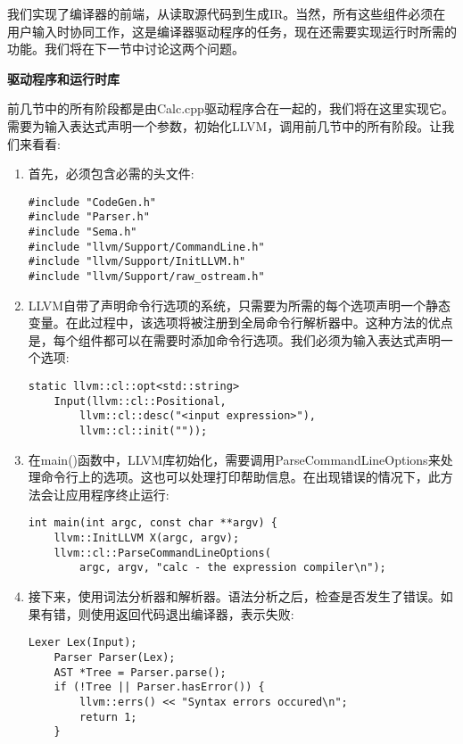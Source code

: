 我们实现了编译器的前端，从读取源代码到生成IR。当然，所有这些组件必须在用户输入时协同工作，这是编译器驱动程序的任务，现在还需要实现运行时所需的功能。我们将在下一节中讨论这两个问题。\par

\hspace*{\fill} \par %
\textbf{驱动程序和运行时库}

前几节中的所有阶段都是由Calc.cpp驱动程序合在一起的，我们将在这里实现它。需要为输入表达式声明一个参数，初始化LLVM，调用前几节中的所有阶段。让我们来看看:

\begin{enumerate}
\item 首先，必须包含必需的头文件:
\begin{lstlisting}[caption={}]
#include "CodeGen.h"
#include "Parser.h"
#include "Sema.h"
#include "llvm/Support/CommandLine.h"
#include "llvm/Support/InitLLVM.h"
#include "llvm/Support/raw_ostream.h"
\end{lstlisting}

\item LLVM自带了声明命令行选项的系统，只需要为所需的每个选项声明一个静态变量。在此过程中，该选项将被注册到全局命令行解析器中。这种方法的优点是，每个组件都可以在需要时添加命令行选项。我们必须为输入表达式声明一个选项:
\begin{lstlisting}[caption={}]
static llvm::cl::opt<std::string>
	Input(llvm::cl::Positional,
		llvm::cl::desc("<input expression>"),
		llvm::cl::init(""));
\end{lstlisting}

\item 在main()函数中，LLVM库初始化，需要调用ParseCommandLineOptions来处理命令行上的选项。这也可以处理打印帮助信息。在出现错误的情况下，此方法会让应用程序终止运行:
\begin{lstlisting}[caption={}]
int main(int argc, const char **argv) {
	llvm::InitLLVM X(argc, argv);
	llvm::cl::ParseCommandLineOptions(
		argc, argv, "calc - the expression compiler\n");
\end{lstlisting}

\item 接下来，使用词法分析器和解析器。语法分析之后，检查是否发生了错误。如果有错，则使用返回代码退出编译器，表示失败:
\begin{lstlisting}[caption={}]
	Lexer Lex(Input);
	Parser Parser(Lex);
	AST *Tree = Parser.parse();
	if (!Tree || Parser.hasError()) {
		llvm::errs() << "Syntax errors occured\n";
		return 1;
	}
\end{lstlisting}


\end{enumerate}
